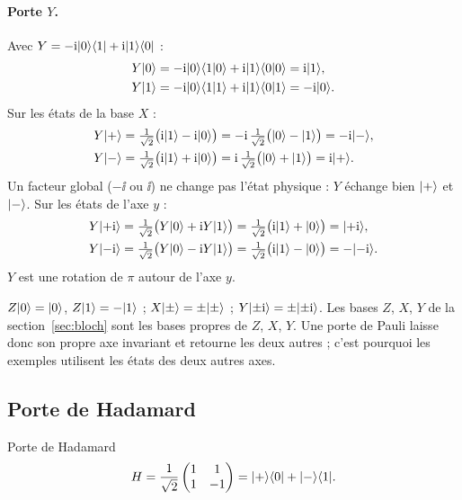 \paragraph{Porte $Y$.} Avec $Y=-\mathrm{i}|0\rangle\langle 1|+\mathrm{i}|1\rangle\langle 0|$ :
\begin{align*}
  Y|0\rangle&=-\mathrm{i}|0\rangle\langle 1|0\rangle+\mathrm{i}|1\rangle\langle 0|0\rangle=\mathrm{i}|1\rangle,\\
  Y|1\rangle&=-\mathrm{i}|0\rangle\langle 1|1\rangle+\mathrm{i}|1\rangle\langle 0|1\rangle=-\mathrm{i}|0\rangle.
\end{align*}
Sur les états de la base $X$ :
\begin{align*}
  Y|+\rangle&=\tfrac{1}{\sqrt2}\big(\mathrm{i}|1\rangle-\mathrm{i}|0\rangle\big)=-\mathrm{i}\,\tfrac{1}{\sqrt2}\big(|0\rangle-|1\rangle\big)=-\mathrm{i}|-\rangle,\\
  Y|-\rangle&=\tfrac{1}{\sqrt2}\big(\mathrm{i}|1\rangle+\mathrm{i}|0\rangle\big)=\mathrm{i}\,\tfrac{1}{\sqrt2}\big(|0\rangle+|1\rangle\big)=\mathrm{i}|+\rangle.
\end{align*}
Un facteur global ($-\ii$ ou $\ii$) ne change pas l'état physique : $Y$ échange bien
$|+\rangle$ et $|-\rangle$. Sur les états de l'axe $y$ :
\begin{align*}
  Y|{+}\mathrm{i}\rangle&=\tfrac{1}{\sqrt2}\big(Y|0\rangle+\mathrm{i} Y|1\rangle\big)
   =\tfrac{1}{\sqrt2}\big(\mathrm{i}|1\rangle+|0\rangle\big)=|{+}\mathrm{i}\rangle,\\
  Y|{-}\mathrm{i}\rangle&=\tfrac{1}{\sqrt2}\big(Y|0\rangle-\mathrm{i} Y|1\rangle\big)
   =\tfrac{1}{\sqrt2}\big(\mathrm{i}|1\rangle-|0\rangle\big)=-|{-}\mathrm{i}\rangle.
\end{align*}
$Y$ est une rotation de $\pi$ autour de l'axe $y$.

\begin{remarque}
$Z|0\rangle=|0\rangle$, $Z|1\rangle=-|1\rangle$ ; $X|\pm\rangle=\pm|\pm\rangle$ ; $Y|{\pm}\mathrm{i}\rangle=\pm|{\pm}\mathrm{i}\rangle$.
Les bases $Z$, $X$, $Y$ de la section~\ref{sec:bloch} sont les bases propres de
$Z$, $X$, $Y$. Une porte de Pauli laisse donc son propre axe invariant et retourne les
deux autres ; c'est pourquoi les exemples utilisent les états des deux autres axes.
\end{remarque}

\subsection{Porte de Hadamard}\label{sec:hadamard}

\begin{definition}{Porte de Hadamard}
\[
  H=\frac{1}{\sqrt2}\begin{pmatrix}1 & 1\\ 1 & -1\end{pmatrix}
  =|+\rangle\langle 0|+|-\rangle\langle 1|.
\]
\end{definition}

